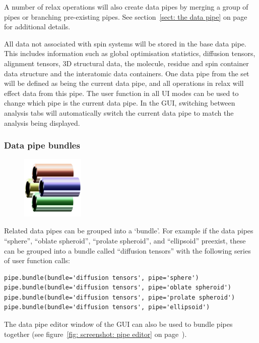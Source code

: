 A number of relax operations will also create data pipes by merging a group of pipes or branching pre-existing pipes.
See section~\ref{sect: the data pipe} on page~\pageref{sect: the data pipe} for additional details.

All data not associated with spin systems will be stored in the base data pipe.
This includes information such as global optimisation statistics, diffusion tensors, alignment tensors, 3D structural data, the molecule, residue and spin container data structure and the interatomic data containers.
One data pipe from the set will be defined as being the current data pipe, and all operations in relax will effect data from this pipe.
The  user function in all UI modes can be used to change which pipe is the current data pipe.
In the GUI, switching between analysis tabs will automatically switch the current data pipe to match the analysis being displayed.


\subsubsection{Data pipe bundles} \label{sect: data pipe bundles}

\begin{figure}[h]
  \includegraphics[width=3cm, bb=0 0 1701 1701]{graphics/misc/pipe_bundle_600x600}
\end{figure}

Related data pipes can be grouped into a `bundle'.
For example if the data pipes ``sphere'', ``oblate spheroid'', ``prolate spheroid'', and ``ellipsoid'' preexist, these can be grouped into a bundle called ``diffusion tensors'' with the following series of user function calls:

\begin{lstlisting}
pipe.bundle(bundle='diffusion tensors', pipe='sphere')
pipe.bundle(bundle='diffusion tensors', pipe='oblate spheroid')
pipe.bundle(bundle='diffusion tensors', pipe='prolate spheroid')
pipe.bundle(bundle='diffusion tensors', pipe='ellipsoid')
\end{lstlisting}

The data pipe editor window of the GUI can also be used to bundle pipes together (see figure~\ref{fig: screenshot: pipe editor} on page~\pageref{fig: screenshot: pipe editor}).



